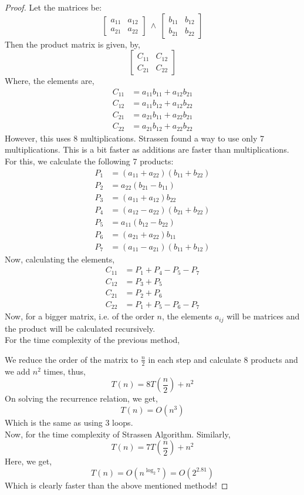 \begin{proof}
	Let the matrices be:\\
	\[\begin{bmatrix}a_{11}&a_{12}\\ a_{21}&a_{22}\end{bmatrix} \ \land \ \begin{bmatrix} b_{11}&b_{12}\\b_{21}&b_{22}\end{bmatrix}\]
	Then the product matrix is given, by,
	\[\begin{bmatrix} C_{11}& C_{12} \\ C_{21} & C_{22} \end{bmatrix}\]
	Where, the elements are,
	\[\begin{split}
			C_{11}&=a_{11}b_{11}+a_{12}b_{21} \\
			C_{12}&=a_{11}b_{12}+a_{12}b_{22}\\
			C_{21}&=a_{21}b_{11}+a_{22}b_{21}\\
			C_{22}&=a_{21}b_{12}+a_{22}b_{22}
		\end{split}\]
	However, this uses 8 multiplications. Strassen found a way to use only 7 multiplications. This is a bit faster as additions are faster than multiplications.
	For this, we calculate the following 7 products:
	\[\begin{split}
			P_1&=(a_{11}+a_{22})(b_{11}+b_{22})\\
			P_2&=a_{22}(b_{21}-b_{11})\\
			P_3&=(a_{11}+a_{12})b_{22}\\
			P_4&=(a_{12}-a_{22})(b_{21}+b_{22})\\
			P_5&=a_{11}(b_{12}-b_{22})\\
			P_6&=(a_{21}+a_{22})b_{11}\\
			P_7&=(a_{11}-a_{21})(b_{11}+b_{12})
		\end{split}\]
	Now, calculating the elements,
	\[\begin{split}
			C_{11}&=P_1+P_4-P_5-P_7\\
			C_{12}&=P_3+P_5\\
			C_{21}&=P_2+P_6\\
			C_{22}&=P_1+P_5-P_6-P_7
		\end{split}\]
	Now, for a bigger matrix, i.e. of the order $n$, the elements $a_{ij}$ will be matrices and the product will be calculated recursively.\\
	For the time complexity of the previous method,

	We reduce the order of the matrix to $\frac{n}{2}$ in each step and calculate 8 products and we add $n^2$ times, thus,
	\[T(n)= 8T(\frac{n}{2})+n^2\]
	On solving the recurrence relation, we get,
	\[T(n)=O(n^3)\]
	Which is the same as using 3 loops.\\
	Now, for the time complexity of Strassen Algorithm. Similarly,
	\[T(n)=7T(\frac{n}{2})+n^2\]
	Here, we get,
	\[T(n)=O(n^{\log_2 7})=O(2^{2.81})\]
	Which is clearly faster than the above mentioned methods!
\end{proof}
